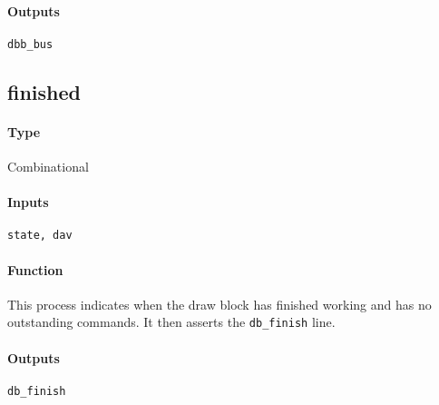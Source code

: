 \documentclass[12pt]{article}
\begin{document}
\paragraph{Outputs}
\verb|dbb_bus|

\subsection{finished}
\paragraph{Type}
Combinational
\paragraph{Inputs}
\verb|state, dav|
\paragraph{Function}
This process indicates when the draw block has finished working and
has no outstanding commands. It then asserts the \verb|db_finish|
line.
\paragraph{Outputs}
\verb|db_finish|
\end{document}
